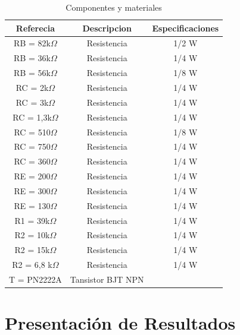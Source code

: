 \documentclass[10pt, a4paper]{article}
\begin{document}
    \begin{table}[h!]
        \centering
        \caption{Componentes y materiales}
        \label{tab:componentes}
        \begin{tabular}{|c|c|c|} \hline
            Referecia&Descripcion&    Especificaciones   \\ \hline
            RB = 82k$\Omega$   &  Resistencia&         1/2 W         \\
            RB = 36k$\Omega$   &  Resistencia&         1/4 W         \\
            RB = 56k$\Omega$   &  Resistencia&         1/8 W         \\
            RC = 2k$\Omega$    &  Resistencia&         1/4 W         \\
            RC = 3k$\Omega$    &  Resistencia&         1/4 W         \\
            RC = 1,3k$\Omega$  &  Resistencia&         1/4 W         \\
            RC = 510$\Omega$   &  Resistencia&         1/8 W         \\
            RC = 750$\Omega$   &  Resistencia&         1/4 W         \\
            RC = 360$\Omega$   &  Resistencia&         1/4 W         \\
            RE = 200$\Omega$   &  Resistencia&         1/4 W         \\
            RE = 300$\Omega$   &  Resistencia&         1/4 W         \\
            RE = 130$\Omega$   &  Resistencia&         1/4 W         \\
            R1 = 39k$\Omega$   &  Resistencia&         1/4 W         \\
            R2 = 10k$\Omega$   &  Resistencia&         1/4 W         \\
            R2 = 15k$\Omega$   &  Resistencia&         1/4 W         \\
            R2 = 6,8 k$\Omega$ &  Resistencia&         1/4 W         \\ 
            T = PN2222A    &Tansistor BJT NPN&   \\ \hline
        \end{tabular}
    \end{table}

    \newpage

    \section{Presentación de Resultados}
\end{document}
